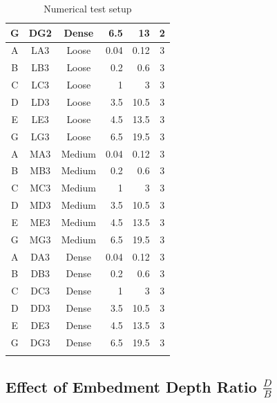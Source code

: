 \documentclass[a4paper, nobind]{templates/ociamthesis}
\begin{document}
\begin{longtable}[c]{@{}|c|c|c|r|r|c|@{}}
G & DG2 & Dense  & 6.5  & 13   & 2 \\* \midrule
\rowcolor[HTML]{FFF2CC} 
A & LA3 & Loose  & 0.04 & 0.12 & 3 \\* \midrule
\rowcolor[HTML]{FFF2CC} 
B & LB3 & Loose  & 0.2  & 0.6  & 3 \\* \midrule
\rowcolor[HTML]{FFF2CC} 
C & LC3 & Loose  & 1    & 3    & 3 \\* \midrule
\rowcolor[HTML]{FFF2CC} 
D & LD3 & Loose  & 3.5  & 10.5 & 3 \\* \midrule
\rowcolor[HTML]{FFF2CC} 
E & LE3 & Loose  & 4.5  & 13.5 & 3 \\* \midrule
\rowcolor[HTML]{FFF2CC} 
G & LG3 & Loose  & 6.5  & 19.5 & 3 \\* \midrule
\rowcolor[HTML]{FFD966} 
A & MA3 & Medium & 0.04 & 0.12 & 3 \\* \midrule
\rowcolor[HTML]{FFD966} 
B & MB3 & Medium & 0.2  & 0.6  & 3 \\* \midrule
\rowcolor[HTML]{FFD966} 
C & MC3 & Medium & 1    & 3    & 3 \\* \midrule
\rowcolor[HTML]{FFD966} 
D & MD3 & Medium & 3.5  & 10.5 & 3 \\* \midrule
\rowcolor[HTML]{FFD966} 
E & ME3 & Medium & 4.5  & 13.5 & 3 \\* \midrule
\rowcolor[HTML]{FFD966} 
G & MG3 & Medium & 6.5  & 19.5 & 3 \\* \midrule
\rowcolor[HTML]{BF9000} 
A & DA3 & Dense  & 0.04 & 0.12 & 3 \\* \midrule
\rowcolor[HTML]{BF9000} 
B & DB3 & Dense  & 0.2  & 0.6  & 3 \\* \midrule
\rowcolor[HTML]{BF9000} 
C & DC3 & Dense  & 1    & 3    & 3 \\* \midrule
\rowcolor[HTML]{BF9000} 
D & DD3 & Dense  & 3.5  & 10.5 & 3 \\* \midrule
\rowcolor[HTML]{BF9000} 
E & DE3 & Dense  & 4.5  & 13.5 & 3 \\* \midrule
\rowcolor[HTML]{BF9000} 
G & DG3 & Dense  & 6.5  & 19.5 & 3 \\* \bottomrule
\caption{Numerical test setup}
\label{tab:Numerical test setup}\\
\end{longtable}

\hypertarget{effect-of-embedment-depth-ratio-fracdb}{%
\subsection{\texorpdfstring{Effect of Embedment Depth Ratio \(\frac{D}{B}\)}{Effect of Embedment Depth Ratio \textbackslash frac\{D\}\{B\}}}\label{effect-of-embedment-depth-ratio-fracdb}}
\end{document}
